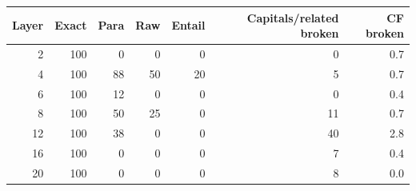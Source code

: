 \begin{tabular}{rrrrrrr}
\toprule
Layer & Exact & Para & Raw & Entail & Capitals/related broken & CF broken\\
\midrule
2 & 100 & 0 & 0 & 0 & 0 & 0.7 \\
4 & 100 & 88 & 50 & 20 & 5 & 0.7 \\
6 & 100 & 12 & 0 & 0 & 0 & 0.4 \\
8 & 100 & 50 & 25 & 0 & 11 & 0.7 \\
12 & 100 & 38 & 0 & 0 & 40 & 2.8 \\
16 & 100 & 0 & 0 & 0 & 7 & 0.4 \\
20 & 100 & 0 & 0 & 0 & 8 & 0.0 \\
\bottomrule
\end{tabular}
